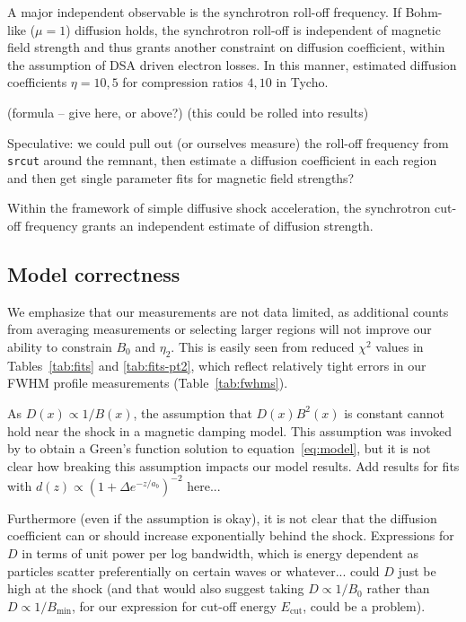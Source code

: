\documentclass[iop, apj, numberedappendix]{emulateapj}
\newcommand*{\mt}{\mathrm}
\newcommand*{\Ecut}{E_{\mt{cut}}}
\begin{document}
A major independent observable is the synchrotron roll-off frequency.  If
Bohm-like ($\mu = 1$) diffusion holds, the synchrotron roll-off is independent
of magnetic field strength and thus grants another constraint on diffusion
coefficient, within the assumption of DSA driven electron losses.  In this
manner, \citet{parizot2006} estimated diffusion coefficients $\eta = 10, 5$ for
compression ratios $4, 10$ in Tycho.

(formula -- give here, or above?)
(this could be rolled into results)

Speculative: we could pull out (or ourselves measure) the roll-off frequency
from \texttt{srcut} around the remnant, then estimate a diffusion coefficient
in each region and then get single parameter fits for magnetic field strengths?

Within the framework of simple diffusive shock acceleration, the synchrotron
cut-off frequency grants an independent estimate of diffusion strength.


\subsection{Model correctness}

We emphasize that our measurements are not data limited, as additional counts
from averaging measurements or selecting larger regions will not improve our
ability to constrain $B_0$ and $\eta_2$.  This is easily seen from reduced
$\chi^2$ values in Tables~\ref{tab:fits} and \ref{tab:fits-pt2}, which
reflect relatively tight errors in our FWHM profile measurements
(Table~\ref{tab:fwhms}).


As $D(x) \propto 1/B(x)$, the assumption that $D(x) B^2(x)$ is constant cannot
hold near the shock in a magnetic damping model.  This assumption was invoked
by \citep{lerche1980} to obtain a Green's function solution to
equation~\eqref{eq:model}, but it is not clear how breaking this assumption
impacts our model results.
Add results for fits with $d(z) \propto (1 + \Delta e^{-z/a_b})^{-2}$ here...


Furthermore (even if the assumption is okay), it is not clear that the
diffusion coefficient can or should increase exponentially behind the shock.
Expressions for $D$ in terms of unit power per log bandwidth, which is energy
dependent as particles scatter preferentially on certain waves or whatever...
could $D$ just be high at the shock (and that would also suggest taking $D
\propto 1 / B_0$ rather than $D \propto 1 / B_{\mt{min}}$, for our expression
for cut-off energy $\Ecut$, could be a problem).
\end{document}
